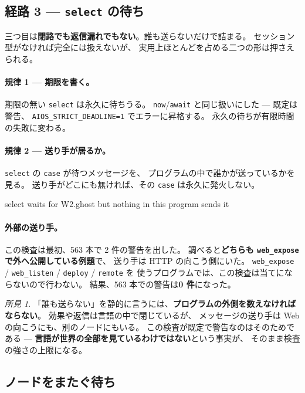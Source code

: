 \documentclass[11pt,a4paper]{ltjsarticle}
\theoremstyle{definition}
\theoremstyle{remark}
\newtheorem{finding}[theorem]{所見}
\begin{document}
\subsection{経路 3 --- \texttt{select} の待ち}
\label{sec:select3}


三つ目は\textbf{閉路でも返信漏れでもない}。誰も送らないだけで詰まる。
セッション型がなければ完全には扱えないが、
実用上ほとんどを占める二つの形は押さえられる。

\paragraph{規律 1 --- 期限を書く。}
期限の無い \texttt{select} は永久に待ちうる。
\texttt{now}/\texttt{await} と同じ扱いにした --- 既定は警告、
\texttt{AIOS\_STRICT\_DEADLINE=1} でエラーに昇格する。
永久の待ちが有限時間の失敗に変わる。

\paragraph{規律 2 --- 送り手が居るか。}
\texttt{select} の \texttt{case} が待つメッセージを、
プログラムの中で誰かが送っているかを見る。
送り手がどこにも無ければ、その \texttt{case} は永久に発火しない。

\begin{term}
[warn] select waits for W2.ghost but nothing in this program sends it
\end{term}

\paragraph{外部の送り手。}
この検査は最初、563 本で 2 件の警告を出した。
調べると\textbf{どちらも \texttt{web\_expose} で外へ公開している例題}で、
送り手は HTTP の向こう側にいた。
\texttt{web\_expose} / \texttt{web\_listen} / \texttt{deploy} / \texttt{remote} を
使うプログラムでは、この検査は当てにならないので行わない。
結果、563 本での警告は\textbf{0 件}になった。

\begin{finding}
「誰も送らない」を静的に言うには、\textbf{プログラムの外側を数えなければならない}。
効果や返信は言語の中で閉じているが、
メッセージの送り手は Web の向こうにも、別のノードにもいる。
この検査が既定で警告なのはそのためである ---
\textbf{言語が世界の全部を見ているわけではない}という事実が、
そのまま検査の強さの上限になる。
\end{finding}

\subsection{ノードをまたぐ待ち}
\label{sec:nodelevel}
\end{document}

